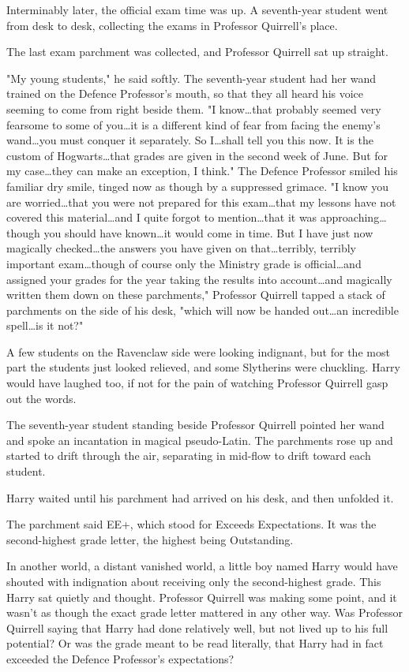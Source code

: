 Interminably later, the official exam time was up. A seventh-year student went
from desk to desk, collecting the exams in Professor Quirrell's place.

The last exam parchment was collected, and Professor Quirrell sat up straight.

"My young students," he said softly. The seventh-year student had her wand
trained on the Defence Professor's mouth, so that they all heard his voice
seeming to come from right beside them. "I know…that probably seemed
very fearsome to some of you…it is a different kind of fear from facing
the enemy's wand…you must conquer it separately. So I…shall
tell you this now. It is the custom of Hogwarts…that grades are given
in the second week of June. But for my case…they can make an exception,
I think." The Defence Professor smiled his familiar dry smile, tinged now as
though by a suppressed grimace. "I know you are worried…that you were
not prepared for this exam…that my lessons have not covered this
material…and I quite forgot to mention…that it was
approaching…though you should have known…it would come in time.
But I have just now magically checked…the answers you have given on
that…terribly, terribly important exam…though of course
only the Ministry grade is official…and assigned your grades for the year
taking the results into account…and magically written them
down on these parchments," Professor Quirrell tapped a stack of parchments on
the side of his desk, "which will now be handed out…an incredible
spell…is it not?"

A few students on the Ravenclaw side were looking indignant, but for the most
part the students just looked relieved, and some Slytherins were chuckling.
Harry would have laughed too, if not for the pain of watching Professor
Quirrell gasp out the words.

The seventh-year student standing beside Professor Quirrell pointed her wand
and spoke an incantation in magical pseudo-Latin. The parchments rose up and
started to drift through the air, separating in mid-flow to drift toward each
student.

Harry waited until his parchment had arrived on his desk, and then unfolded it.

The parchment said EE+, which stood for Exceeds Expectations. It was the
second-highest grade letter, the highest being Outstanding.

In another world, a distant vanished world, a little boy named Harry would have
shouted with indignation about receiving only the second-highest grade. This
Harry sat quietly and thought. Professor Quirrell was making some point, and it
wasn't as though the exact grade letter mattered in any other way. Was
Professor Quirrell saying that Harry had done relatively well, but not lived up
to his full potential? Or was the grade meant to be read literally, that Harry
had in fact exceeded the Defence Professor's expectations?

